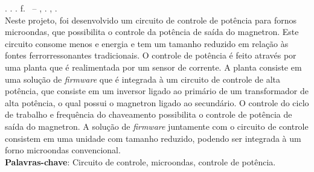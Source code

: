 
\begin{resumo}[RESUMO]
\begin{SingleSpacing}

\imprimirautorcitacao. \imprimirtitulo. \imprimirdata. \pageref {LastPage} f. \imprimirprojeto\ – \imprimirprograma, \imprimirinstituicao. \imprimirlocal, \imprimirdata.\\


Neste projeto, foi desenvolvido um circuito de controle de potência para fornos microondas, que possibilita o controle da potência de saída do magnetron. Este circuito consome menos e energia e tem um tamanho reduzido em relação às fontes ferrorressonantes tradicionais. O controle de potência é feito através por uma planta que é realimentada por um sensor de corrente. A planta consiste em uma solução de \textit{firmware} que é integrada à um circuito de controle de alta potência, que consiste em um inversor ligado ao primário de um transformador de alta potência, o qual possui o magnetron ligado ao secundário. O controle do ciclo de trabalho e frequência do chaveamento possibilita o controle de potência de saída do magnetron. A solução de \textit{firmware} juntamente com o circuito de controle consistem em uma unidade com tamanho reduzido, podendo ser integrada à um forno microondas convencional.\\

\textbf{Palavras-chave}: Circuito de controle, microondas, controle de potência.

\end{SingleSpacing}
\end{resumo}

